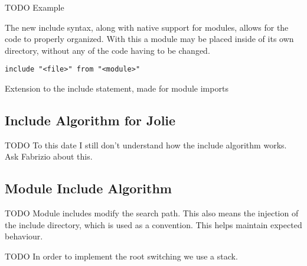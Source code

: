 TODO Example

The new include syntax, along with native support for modules, allows for the
code to properly organized. With this a module may be placed inside of its own
directory, without any of the code having to be changed.

\begin{listing}[H]
\begin{verbatim}
include "<file>" from "<module>"
\end{verbatim}
\caption{Extension to the include statement, made for module imports}
\label{lst:mod_include}
\end{listing}

\subsection{Include Algorithm for Jolie}

TODO To this date I still don't understand how the include algorithm works. Ask
Fabrizio about this.

\subsection{Module Include Algorithm}

TODO Module includes modify the search path. This also means the injection of
the include directory, which is used as a convention. This helps maintain
expected behaviour.

TODO In order to implement the root switching we use a stack.
